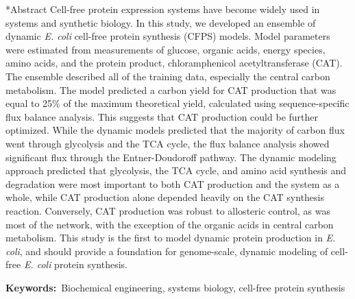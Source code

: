 \documentclass[12pt]{article}
\makeatletter
\renewcommand\section{\@startsection
	{subsection}{2}{0mm}
	{-0.2in}
	{0.05\baselineskip}
	{\normalfont\large\bfseries}}
\makeatother
\begin{document}
\section*{Abstract}
Cell-free protein expression systems have become widely used in systems and synthetic biology.
In this study, we developed an ensemble of dynamic \textit{E. coli} cell-free protein synthesis (CFPS) models.
Model parameters were estimated from measurements of glucose, organic acids, energy species, amino acids, and the protein product, chloramphenicol acetyltransferase (CAT).
The ensemble described all of the training data, especially the central carbon metabolism.
The model predicted a carbon yield for CAT production that was equal to 25\% of the maximum theoretical yield, calculated using sequence-specific flux balance analysis.
This suggests that CAT production could be further optimized.
While the dynamic models predicted that the majority of carbon flux went through glycolysis and the TCA cycle, the flux balance analysis showed significant flux through the Entner-Doudoroff pathway.
The dynamic modeling approach predicted that glycolysis, the TCA cycle, and amino acid synthesis and degradation were most important to both CAT production and the system as a whole, while CAT production alone depended heavily on the CAT synthesis reaction.
Conversely, CAT production was robust to allosteric control, as was most of the network, with the exception of the organic acids in central carbon metabolism.
This study is the first to model dynamic protein production in \textit{E. coli}, and should provide a foundation for genome-scale,
dynamic modeling of cell-free \textit{E. coli} protein synthesis.

\vspace{0.1in}
{\noindent \textbf{Keywords:}~Biochemical engineering, systems biology, cell-free protein synthesis}

\pagebreak

\setcounter{page}{1}


\linenumbers
\end{document}
